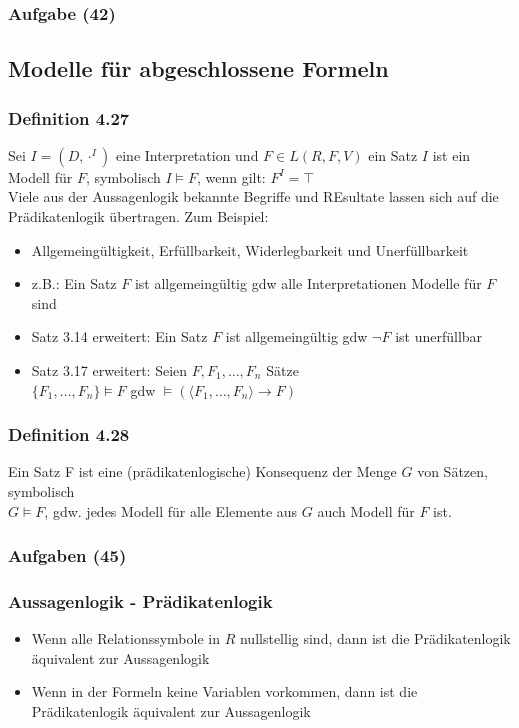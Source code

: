 \subsubsection{Aufgabe (42)}
\subsection{Modelle für abgeschlossene Formeln}
\subsubsection{Definition 4.27}
Sei \(I = (D,\cdot ^I)\) eine Interpretation und \(F\in L(R,F,V)\) ein Satz \(I\) ist ein Modell für \(F\), symbolisch \(I \vDash F\), wenn gilt: \(F^I = \top \) \\
Viele aus der Aussagenlogik bekannte Begriffe und REsultate lassen sich auf die Prädikatenlogik übertragen. Zum Beispiel:
\begin{itemize}
	\item Allgemeingültigkeit, Erfüllbarkeit, Widerlegbarkeit und Unerfüllbarkeit
	\item z.B.: Ein Satz \(F\) ist allgemeingültig gdw alle Interpretationen Modelle für \(F\) sind
	\item Satz 3.14 erweitert: Ein Satz \(F\) ist allgemeingültig gdw  \(\neg F\) ist unerfüllbar
	\item Satz 3.17 erweitert: Seien \(F,F_{1}, \ldots, F_{n}\) Sätze\\ \(\{F_{1}, \ldots , F_{n}\} \vDash F\) gdw \(\vDash (\langle F_{1}, \ldots, F_{n} \rangle \to F)\)
\end{itemize}
\subsubsection{Definition 4.28}
Ein Satz F ist eine (prädikatenlogische) Konsequenz der Menge \(G\) von Sätzen, symbolisch \\ \(G \vDash F\), gdw. jedes Modell für alle Elemente aus \(G\) auch Modell für \(F\) ist.
\subsubsection{Aufgaben (45)}
\subsubsection{Aussagenlogik - Prädikatenlogik}
\begin{itemize}
	\item Wenn alle Relationssymbole in \(R\) nullstellig sind, dann ist die Prädikatenlogik äquivalent zur Aussagenlogik
	\item Wenn in der Formeln keine Variablen vorkommen, dann ist die Prädikatenlogik äquivalent zur Aussagenlogik
\end{itemize}
